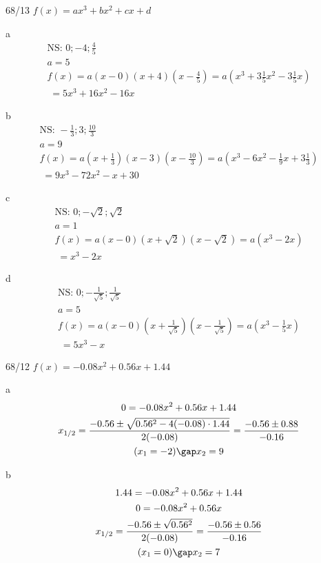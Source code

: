 \begin{exercise}{68/13}
  $f(x) = ax^3 + bx^2 + cx + d$
  \item [a]
  \begin{gather*}
    \text{NS: } 0; -4; \frac{4}{5} \\
    a = 5 \\
    f(x) = a(x - 0)(x + 4)(x - \frac{4}{5}) = a(x^3 + 3\frac{1}{5}x^2 - 3\frac{1}{5}x) \\
    \;= 5x^3 + 16x^2 - 16x
  \end{gather*}
  \item [b]
  \begin{gather*}
    \text{NS: } -\frac{1}{3}; 3; \frac{10}{3} \\
    a = 9 \\
    f(x) = a(x + \frac{1}{3})(x - 3)(x - \frac{10}{3}) = a(x^3 - 6x^2 - \frac{1}{9}x + 3\frac{1}{3}) \\
    \;= 9x^3 - 72x^2 - x + 30
  \end{gather*}
  \item [c]
  \begin{gather*}
    \text{NS: } 0; -\sqrt{2}; \sqrt{2} \\
    a = 1 \\
    f(x) = a(x - 0)(x + \sqrt{2})(x - \sqrt{2}) = a(x^3 - 2x) \\
    \;= x^3 - 2x
  \end{gather*}
  \item [d]
  \begin{gather*}
    \text{NS: } 0; -\frac{1}{\sqrt{5}}; \frac{1}{\sqrt{5}} \\
    a = 5 \\
    f(x) = a(x - 0)(x + \frac{1}{\sqrt{5}})(x - \frac{1}{\sqrt{5}}) = a(x^3 - \frac{1}{5}x) \\
    \;= 5x^3 - x
  \end{gather*}
\end{exercise}
\begin{exercise}{68/12}
  $f(x) = -0.08x^2 + 0.56x + 1.44$
  \item [a]
  \begin{gather*}
    0 = -0.08x^2 + 0.56x + 1.44 \\
    x_{1/2} = \frac{-0.56 \pm \sqrt{0.56^2 - 4(-0.08) \cdot 1.44}}{2(-0.08)} = \frac{-0.56 \pm 0.88}{-0.16} \\
    (x_1 = -2) \gap x_2 = 9
  \end{gather*}
  \item [b]
  \begin{gather*}
    1.44 = -0.08x^2 + 0.56x + 1.44 \\
    0 = -0.08x^2 + 0.56x \\
    x_{1/2} = \frac{-0.56 \pm \sqrt{0.56^2}}{2(-0.08)} = \frac{-0.56 \pm 0.56}{-0.16} \\
    (x_1 = 0) \gap x_2 = 7
  \end{gather*}
\end{exercise}
